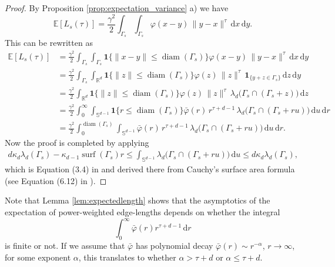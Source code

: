 \documentclass{article}
\theoremstyle{definition}
\numberwithin{equation}{section}
\theoremstyle{remark}
\begin{document}
\begin{proof}
By Proposition \ref{prop:expectation_variance} a) we have
$$
\mathbb{E}[L_s (\tau)]= \frac{\gamma^2}{2} \int_{\Gamma_s} \int_{\Gamma_s} 
       \varphi(x-y)\,\|y-x\|^{\tau}\, \mathrm{d}x\, \mathrm{d}y.
$$
This can be rewritten as
\begin{align*}
\mathbb{E}[L_s (\tau)]
  &= \frac{\gamma^2}{2} \int_{\Gamma_s} \int_{\Gamma_s} \mathbf{1}\{\|x-y\|\le\operatorname{diam}(\Gamma_s)\}
       \varphi(x-y)\,\|y-x\|^{\tau}\, \mathrm{d}x\, \mathrm{d}y \\[0.5em]
  &= \frac{\gamma^2}{2}  \int_{\Gamma_s} \int_{\mathbb{R}^d} \mathbf{1}\{\|z\|\le\operatorname{diam}(\Gamma_s)\}
       \varphi(z)\,\|z\|^{\tau}\, \mathbf{1}_{\{y+z \in \Gamma_s\}}\, \mathrm{d}z\, \mathrm{d}y \\[0.5em]
  &= \frac{\gamma^2}{2} \int_{\mathbb{R}^d} \mathbf{1}\{\|z\|\le\operatorname{diam}(\Gamma_s)\} \varphi(z)\,\|z\|^{\tau}\,
       \lambda_d\big(\Gamma_s\cap (\Gamma_s+z)\big)\, \mathrm{d}z \\[0.5em]
  &= \frac{\gamma^2}{2}\int_{0}^{\infty}\int_{\mathbb{S}^{d-1}} 
      \mathbf{1}\{r\le\operatorname{diam}(\Gamma_s)\} \bar{\varphi}(r)\,r^{\tau+d-1}\,
       \lambda_d\!\big(\Gamma_s\cap (\Gamma_s+ru)\big)\,
        \mathrm{d}u\, \mathrm{d}r \\
  &= \frac{\gamma^2}{2} \int_{0}^{\operatorname{diam}(\Gamma_s)}\int_{\mathbb{S}^{d-1}} 
       \bar{\varphi}(r)\,r^{\tau+d-1}\,
       \lambda_d\!\big(\Gamma_s\cap (\Gamma_s+ru)\big)\,
        \mathrm{d}u\, \mathrm{d}r.
\end{align*}
Now the proof is completed by applying 
\begin{align*}
   d \kappa_d \lambda_d(\Gamma_s)  -\kappa_{d-1} \operatorname{surf}(\Gamma_s) r\leq \int_{\mathbb{S}^{d-1}} 
       \lambda_d\!\big(\Gamma_s\cap (\Gamma_s+ru)\big)\,
        \mathrm{d}u \leq d \kappa_d \lambda_d(\Gamma_s),
\end{align*}
which is Equation (3.4) in \cite{reitznerschultethaele} and derived there from Cauchy’s surface area formula (see Equation (6.12) in \cite{SW}).
\end{proof}



Note that Lemma \ref{lem:expectedlength} shows that the asymptotics of the expectation of power-weighted edge-lengths depends on whether the integral
$$\int_0^\infty \bar{\varphi} (r) r^{\tau + d -1} \, \mathrm{d} r $$
is finite or not. If we assume that $\bar{\varphi}$ has polynomial decay $\bar{\varphi}(r) \sim r^{-\alpha}$, $r \to \infty$, for some exponent $\alpha$, this translates to whether $\alpha>\tau +d$ or $\alpha\leq\tau +d$.
\end{document}
